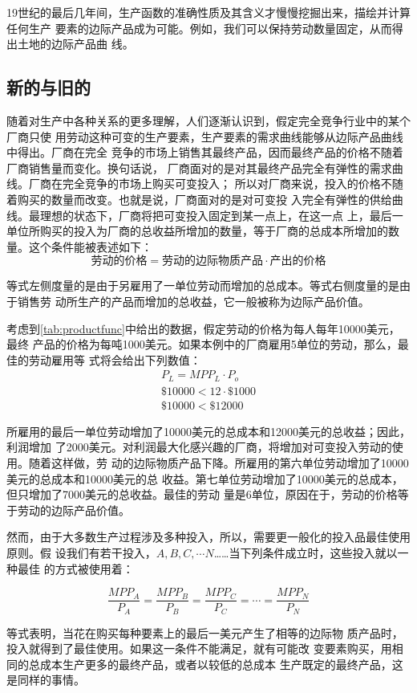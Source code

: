 19世纪的最后几年间，生产函数的准确性质及其含义才慢慢挖掘出来，描绘并计算任何生产
要素的边际产品成为可能。例如，我们可以保持劳动数量固定，从而得出土地的边际产品曲
线。

\subsection{新的与旧的}

随着对生产中各种关系的更多理解，人们逐渐认识到，假定完全竞争行业中的某个厂商只使
用劳动这种可变的生产要素，生产要素的需求曲线能够从边际产品曲线中得出。厂商在完全
竞争的市场上销售其最终产品，因而最终产品的价格不随着厂商销售量而变化。换句话说，
厂商面对的是对其最终产品完全有弹性的需求曲线。厂商在完全竞争的市场上购买可变投入；
所以对厂商来说，投入的价格不随着购买的数量而改变。也就是说，厂商面对的是对可变投
入完全有弹性的供给曲线。最理想的状态下，厂商将把可变投入固定到某一点上，在这一点
上，最后一单位所购买的投入为厂商的总收益所增加的数量，等于厂商的总成本所增加的数
量。这个条件能被表述如下：
\[劳动的价格=劳动的边际物质产品 \cdot 产出的价格\]

等式左侧度量的是由于另雇用了一单位劳动而增加的总成本。等式右侧度量的是由于销售劳
动所生产的产品而增加的总收益，它一般被称为边际产品价值。

考虑到\cref{tab:productfunc}中给出的数据，假定劳动的价格为每人每年10000美元，最终
产品的价格为每吨1000美元。如果本例中的厂商雇用5单位的劳动，那么，最佳的劳动雇用等
式将会给出下列数值：
\begin{gather*}
  P_L=MPP_L \cdot P_o\\
  \$ 10000 < 12 \cdot \$1000\\
  \$ 10000 < \$ 12000
\end{gather*}

所雇用的最后一单位劳动增加了10000美元的总成本和12000美元的总收益；因此，利润增加
了2000美元。对利润最大化感兴趣的厂商，将增加对可变投入劳动的使用。随着这样做，劳
动的边际物质产品下降。所雇用的第六单位劳动增加了10000美元的总成本和10000美元的总
收益。第七单位劳动增加了10000美元的总成本，但只增加了7000美元的总收益。最佳的劳动
量是6单位，原因在于，劳动的价格等于劳动的边际产品价值。

然而，由于大多数生产过程涉及多种投入，所以，需要更一般化的投入品最佳使用原则。假
设我们有若干投入，$A, B, C , \cdots N$……当下列条件成立时，这些投入就以一种最佳
的方式被使用着：

\[\frac{MPP_A}{P_A} = \frac{MPP_B}{P_B} = \frac{MPP_C}{P_C} = \cdots = \frac{MPP_N}{P_N}\]

等式表明，当花在购买每种要素上的最后一美元产生了相等的边际物
质产品时，投入就得到了最佳使用。如果这一条件不能满足，就有可能改
变要素购买，用相同的总成本生产更多的最终产品，或者以较低的总成本
生产既定的最终产品，这是同样的事情。

